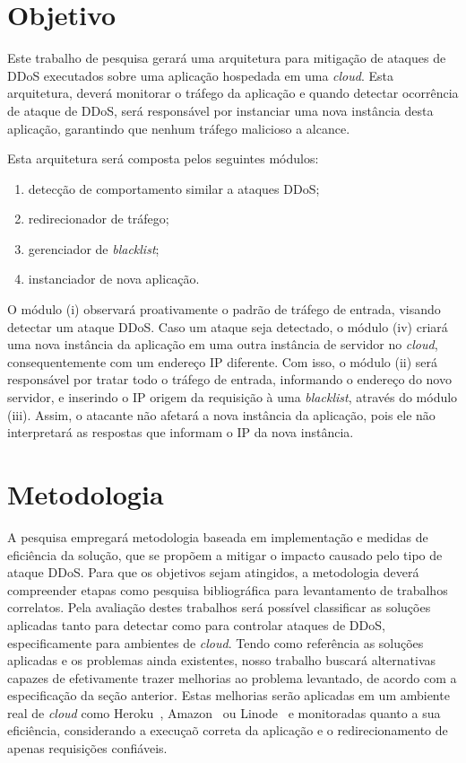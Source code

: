 \documentclass[a4paper, 11pt]{article}
\begin{document}
\section{Objetivo}
Este trabalho de pesquisa gerar\'a uma arquitetura para mitigação de ataques de
DDoS executados sobre uma aplicação hospedada em uma \emph{cloud}. Esta
arquitetura, dever\'a monitorar o tr\'afego da aplica\c{c}\~{a}o e quando
detectar
ocorrência de ataque de DDoS, ser\'a respons\'avel por instanciar uma nova instância desta
aplica\c{c}\~{a}o, garantindo que nenhum tr\'afego malicioso a alcance.

Esta arquitetura será composta pelos seguintes módulos:
\begin{enumerate}[i]
  \item detecção de comportamento similar a ataques DDoS;
  \item redirecionador de tráfego;
  \item gerenciador de \emph{blacklist};
  \item instanciador de nova aplica\c{c}\~{a}o.
\end{enumerate}  

O módulo (i) observará proativamente o padrão de tráfego de entrada, visando
detectar um ataque DDoS. Caso um ataque seja detectado, o m\'odulo (iv) criará uma nova
instância da aplicação em uma outra instância de servidor no \emph{cloud}, consequentemente com um endereço IP diferente.
Com isso, o módulo (ii) será responsável por tratar todo o tráfego de
entrada, informando o endereço do novo servidor, e inserindo o IP origem da
requisição à uma \emph{blacklist}, através do módulo (iii). Assim, o
atacante não afetará a nova instância da aplicação, pois ele não interpretará as
respostas que informam o IP da nova instância.


\section{Metodologia}
A pesquisa empregar\'a metodologia baseada em implementa\c{c}\~{a}o e medidas de
efici\^encia da solu\c{c}\~{a}o, que se propõem a mitigar o impacto causado pelo
tipo de ataque DDoS. Para que os objetivos sejam atingidos, a metodologia dever\'a
compreender etapas como pesquisa bibliogr\'afica para levantamento de trabalhos
correlatos. Pela avalia\c{c}\~{a}o destes trabalhos ser\'a poss\'ivel
classificar as
solu\c{c}\~oes aplicadas tanto para detectar como para controlar ataques de
DDoS,
especificamente para ambientes de \emph{cloud}. Tendo como refer\^encia as
solu\c{c}\~oes aplicadas e os problemas ainda existentes, nosso trabalho
buscar\'a
alternativas capazes de efetivamente trazer melhorias ao problema levantado,
de acordo com a especificação da seção anterior.
Estas melhorias ser\~ao aplicadas em um ambiente real de \emph{cloud} como
Heroku~\cite{heroku}, Amazon~\cite{amazon}
ou Linode~\cite{linode} e monitoradas quanto a sua efici\^encia, considerando a
execu\c{c}a\~o correta da aplica\c{c}\~{a}o e o redirecionamento de apenas requisições
confi\'aveis.
\end{document}
